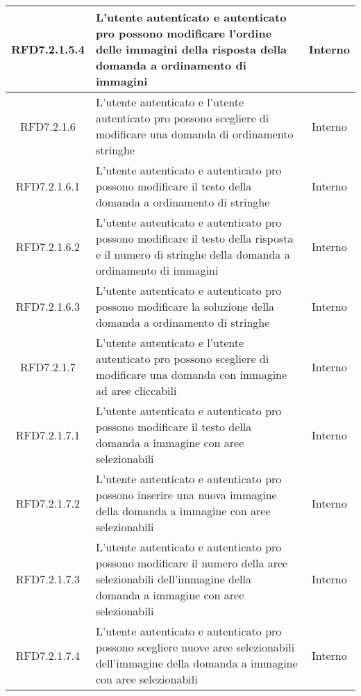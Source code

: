 \begin{longtable}{|c|>{\centering}m{7cm}|c|}
\hypertarget{RFD7.2.1.5.4}{RFD7.2.1.5.4} & L’utente autenticato e autenticato pro possono modificare l’ordine delle immagini della risposta della domanda a ordinamento di immagini & Interno
\\ \hline

\hypertarget{RFD7.2.1.6}{RFD7.2.1.6} & L’utente autenticato e l’utente autenticato pro possono scegliere di modificare una domanda di ordinamento stringhe & Interno
\\ \hline

\hypertarget{RFD7.2.1.6.1}{RFD7.2.1.6.1} & L’utente autenticato e autenticato pro possono modificare il testo della domanda a ordinamento di stringhe & Interno
\\ \hline

\hypertarget{RFD7.2.1.6.2}{RFD7.2.1.6.2} & L’utente autenticato e autenticato pro possono modificare il testo della risposta e il numero di stringhe della domanda a ordinamento di immagini & Interno
\\ \hline

\hypertarget{RFD7.2.1.6.3}{RFD7.2.1.6.3} & L’utente autenticato e autenticato pro possono modificare la soluzione della domanda a ordinamento di stringhe & Interno
\\ \hline

\hypertarget{RFD7.2.1.7}{RFD7.2.1.7} & L’utente autenticato e l’utente autenticato pro possono scegliere di modificare una domanda con immagine ad aree cliccabili & Interno
\\ \hline

\hypertarget{RFD7.2.1.7.1}{RFD7.2.1.7.1} & L’utente autenticato e autenticato pro possono modificare il testo della domanda a immagine con aree selezionabili & Interno
\\ \hline

\hypertarget{RFD7.2.1.7.2}{RFD7.2.1.7.2} & L’utente autenticato e autenticato pro possono inserire una nuova immagine della domanda a immagine con aree selezionabili & Interno
\\ \hline

\hypertarget{RFD7.2.1.7.3}{RFD7.2.1.7.3} & L’utente autenticato e autenticato pro possono modificare il numero della aree selezionabili dell’immagine della domanda a immagine con aree selezionabili & Interno
\\ \hline

\hypertarget{RFD7.2.1.7.4}{RFD7.2.1.7.4} & L’utente autenticato e autenticato pro possono scegliere nuove aree selezionabili dell’immagine della domanda a immagine con aree selezionabili & Interno
\\ \hline


\end{longtable}
